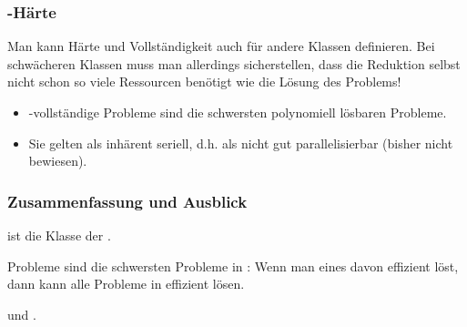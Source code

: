 \documentclass[aspectratio=1610,onlymath]{beamer}
\begin{document}
\begin{frame}\frametitle{-Härte}

Man kann Härte und Vollständigkeit auch für andere Klassen definieren. Bei schwächeren Klassen
muss man allerdings sicherstellen, dass die Reduktion selbst nicht schon so viele Ressourcen benötigt wie
die Lösung des Problems!

\pause

\begin{itemize}
\item {}-vollständige Probleme sind die schwersten polynomiell lösbaren Probleme.
\item Sie gelten als inhärent seriell, d.h. als nicht gut parallelisierbar (bisher nicht bewiesen).
\end{itemize}\pause


\end{frame}


\begin{frame}\frametitle{Zusammenfassung und Ausblick}

 ist die Klasse der .
\bigskip

 Probleme sind die schwersten Probleme in : Wenn man eines davon effizient löst, dann kann alle Probleme in  effizient lösen.
\bigskip

 und .
\bigskip


\end{frame}
\end{document}
